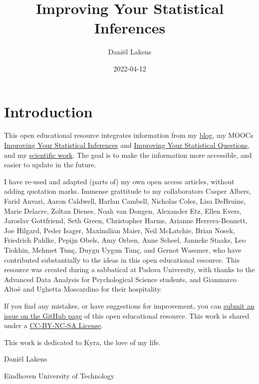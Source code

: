 \documentclass[
  oneside]{book}
\title{Improving Your Statistical Inferences}
\author{Daniël Lakens}
\date{2022-04-12}
\begin{document}
\maketitle

{
\setcounter{tocdepth}{1}
\tableofcontents
}
\hypertarget{introduction}{%
\chapter*{Introduction}\label{introduction}}

This open educational resource integrates information from my \href{https://daniellakens.blogspot.com/}{blog}, my MOOCs \href{https://www.coursera.org/learn/statistical-inferences}{Improving Your Statistical Inferences} and \href{https://www.coursera.org/learn/improving-statistical-questions}{Improving Your Statistical Questions}, and my \href{https://scholar.google.nl/citations?user=ZbqYyrsAAAAJ\&hl=en}{scientific work}. The goal is to make the information more accessible, and easier to update in the future.

I have re-used and adapted (parts of) my own open access articles, without adding quotation marks. Immense grattitude to my collaborators Casper Albers, Farid Anvari, Aaron Caldwell, Harlan Cambell, Nicholas Coles, Lisa DeBruine, Marie Delacre, Zoltan Dienes, Noah van Dongen, Alexander Etz, Ellen Evers, Jaroslav Gottfriend, Seth Green, Christopher Harms, Arianne Herrera-Bennett, Joe Hilgard, Peder Isager, Maximilian Maier, Neil McLatchie, Brian Nosek, Friedrich Pahlke, Pepijn Obels, Amy Orben, Anne Scheel, Janneke Staaks, Leo Tiokhin, Mehmet Tunç, Duygu Uygun Tunç, and Gernot Wassmer, who have contributed substantially to the ideas in this open educational resource. This resource was created during a sabbatical at Padova University, with thanks to the Advanced Data Analysis for Psychological Science students, and Gianmarco Altoè and Ughetta Moscardino for their hospitality.

If you find any mistakes, or have suggestions for improvement, you can \href{https://github.com/Lakens/statistical_inferences/issues}{submit an issue on the GitHub page} of this open educational resource. This work is shared under a \href{https://creativecommons.org/licenses/by-nc-sa/4.0}{CC-BY-NC-SA License}.

This work is dedicated to Kyra, the love of my life.

Daniël Lakens

Eindhoven University of Technology
\end{document}
